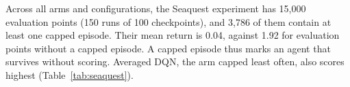 \documentclass[conference,a4paper]{IEEEtran}
\begin{document}
Across all arms and configurations, the Seaquest experiment has 15,000 evaluation points (150 runs of 100 checkpoints),
and 3,786 of them contain at least one capped episode. Their mean return is 0.04, against 1.92 for evaluation points
without a capped episode. A capped episode thus marks an agent that survives without scoring. Averaged DQN, the arm
capped least often, also scores highest (Table~\ref{tab:seaquest}).
\end{document}

